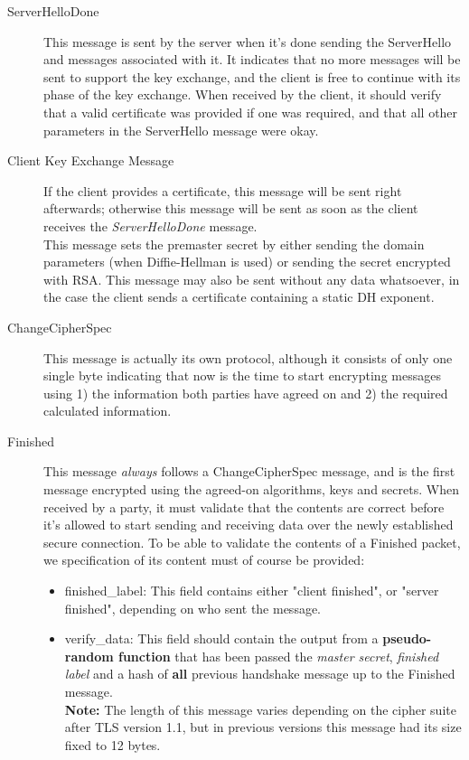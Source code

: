 \begin{description}
	\item[ServerHelloDone] This message is sent by the server when it's done sending the ServerHello and messages associated with it. It indicates that no more messages will be sent to support the key exchange, and the client is free to continue with its phase of the key exchange. When received by the client, it should verify that a valid certificate was provided if one was required, and that all other parameters in the ServerHello message were okay.
	
	\item[Client Key Exchange Message] If the client provides a certificate, this message will be sent right afterwards; otherwise this message will be sent as soon as the client receives the \textit{ServerHelloDone} message. \\This message sets the premaster secret by either sending the domain parameters (when Diffie-Hellman is used) or sending the secret encrypted with RSA. This message may also be sent without any data whatsoever, in the case the client sends a certificate containing a static DH exponent.
	
	\item[ChangeCipherSpec] This message is actually its own protocol, although it consists of only one single byte indicating that now is the time to start encrypting messages using 1) the information both parties have agreed on and 2) the required calculated information.
	
	\item[Finished] This message \textit{always} follows a ChangeCipherSpec message, and is the first message encrypted using the agreed-on algorithms, keys and secrets. When received by a party, it must validate that the contents are correct before it's allowed to start sending and receiving data over the newly established secure connection. To be able to validate the contents of a Finished packet, we specification of its content must of course be provided:
	\begin{itemize}
		\item finished\_label: This field contains either "client finished", or "server finished", depending on who sent the message.

		\item verify\_data: This field should contain the output from a \textbf{pseudo-random function} that has been passed the \textit{master secret}, \textit{finished label} and a hash of \textbf{all} previous handshake message up to the Finished message. \\\textbf{Note:} The length of this message varies depending on the cipher suite after TLS version 1.1, but in previous versions this message had its size fixed to 12 bytes.
	\end{itemize}
	 
\end{description}

